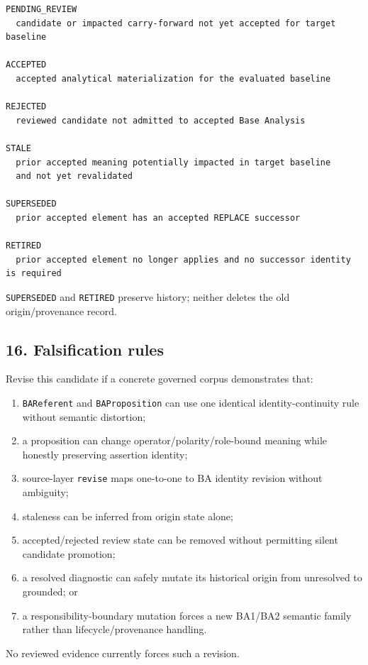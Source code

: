 \documentclass[11pt,a4paper]{article}
\providecommand{\tightlist}{\setlength{\itemsep}{0pt}\setlength{\parskip}{0pt}}\setlength{\emergencystretch}{4em}\hbadness=10000\hfuzz=20pt\sloppy
\begin{document}
\begin{verbatim}
PENDING_REVIEW
  candidate or impacted carry-forward not yet accepted for target baseline

ACCEPTED
  accepted analytical materialization for the evaluated baseline

REJECTED
  reviewed candidate not admitted to accepted Base Analysis

STALE
  prior accepted meaning potentially impacted in target baseline
  and not yet revalidated

SUPERSEDED
  prior accepted element has an accepted REPLACE successor

RETIRED
  prior accepted element no longer applies and no successor identity is required
\end{verbatim}

\texttt{SUPERSEDED} and \texttt{RETIRED} preserve history; neither
deletes the old origin/provenance record.

\subsection{16. Falsification rules}\label{falsification-rules}

Revise this candidate if a concrete governed corpus demonstrates that:

\begin{enumerate}
\def\labelenumi{\arabic{enumi}.}
\tightlist
\item
  \texttt{BAReferent} and \texttt{BAProposition} can use one identical
  identity-continuity rule without semantic distortion;
\item
  a proposition can change operator/polarity/role-bound meaning while
  honestly preserving assertion identity;
\item
  source-layer \texttt{revise} maps one-to-one to BA identity revision
  without ambiguity;
\item
  staleness can be inferred from origin state alone;
\item
  accepted/rejected review state can be removed without permitting
  silent candidate promotion;
\item
  a resolved diagnostic can safely mutate its historical origin from
  unresolved to grounded; or
\item
  a responsibility-boundary mutation forces a new BA1/BA2 semantic
  family rather than lifecycle/provenance handling.
\end{enumerate}

No reviewed evidence currently forces such a revision.
\end{document}
